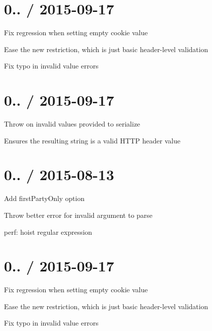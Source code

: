 \section*{0.. / 2015-\/09-\/17 }


\begin{DoxyItemize}
\item Fix regression when setting empty cookie value
\begin{DoxyItemize}
\item Ease the new restriction, which is just basic header-\/level validation
\end{DoxyItemize}
\item Fix typo in invalid value errors
\end{DoxyItemize}

\section*{0.. / 2015-\/09-\/17 }


\begin{DoxyItemize}
\item Throw on invalid values provided to {\ttfamily serialize}
\begin{DoxyItemize}
\item Ensures the resulting string is a valid H\+T\+TP header value
\end{DoxyItemize}
\end{DoxyItemize}

\section*{0.. / 2015-\/08-\/13 }


\begin{DoxyItemize}
\item Add {\ttfamily first\+Party\+Only} option
\item Throw better error for invalid argument to parse
\item perf\+: hoist regular expression
\end{DoxyItemize}

\section*{0.. / 2015-\/09-\/17 }


\begin{DoxyItemize}
\item Fix regression when setting empty cookie value
\begin{DoxyItemize}
\item Ease the new restriction, which is just basic header-\/level validation
\end{DoxyItemize}
\item Fix typo in invalid value errors
\end{DoxyItemize}


